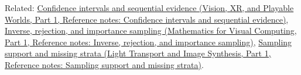 Related: \href{../07-Vision-XR-and-Playable-Worlds-P01/main.pdf\#appendix-c83016554b1e}{Confidence intervals and sequential evidence (Vision, XR, and Playable Worlds, Part 1, Reference notes: Confidence intervals and sequential evidence)}, \href{../02-Mathematics-for-Visual-Computing-P01/main.pdf\#appendix-8d863ed954d0}{Inverse, rejection, and importance sampling (Mathematics for Visual Computing, Part 1, Reference notes: Inverse, rejection, and importance sampling)}, \href{../04-Light-Transport-and-Image-Synthesis-P01/main.pdf\#appendix-10308c3d753e}{Sampling support and missing strata (Light Transport and Image Synthesis, Part 1, Reference notes: Sampling support and missing strata)}.
